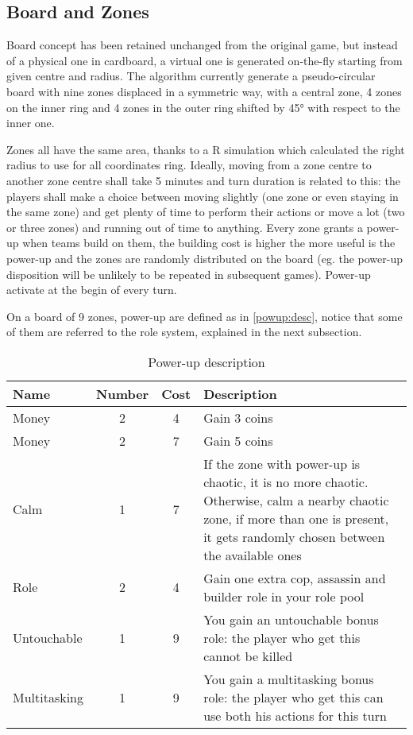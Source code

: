 		\subsection{Board and Zones}
		
			Board concept has been retained unchanged from the original game, but instead of a physical one in cardboard, a virtual one is generated on-the-fly starting from given centre and radius.
			The algorithm currently generate a pseudo-circular board with nine zones displaced in a symmetric way, with a central zone, 4 zones on the inner ring and 4 zones in the outer ring shifted by 45° with respect to the inner one.
			
			
			Zones all have the same area, thanks to a R simulation which calculated the right radius to use for all coordinates ring.
			Ideally, moving from a zone centre to another zone centre shall take 5 minutes and turn duration is related to this: the players shall make a choice between moving slightly (one zone or even staying in the same zone) and get plenty of time to perform their actions or move a lot (two or three zones) and running out of time to anything.
			Every zone grants a power-up when teams build on them, the building cost is higher the more useful is the power-up and the zones are randomly distributed on the board (eg. the power-up disposition will be unlikely to be repeated in subsequent games).
			Power-up activate at the begin of every turn.
			
			On a board of 9 zones, power-up are defined as in \autoref{powup:desc}, notice that some of them are referred to the role system, explained in the next subsection.
			
			\begin{table}
				\caption{Power-up description}
				\label{powup:desc}
				\centering
				\begin{tabular}{lccp{}}
					\toprule
					Name 			& Number 	& Cost 	& Description \\
					\midrule
					Money 			& 2 		& 4 	& Gain 3 coins \\
					Money 			& 2 		& 7 	& Gain 5 coins \\
					Calm 			& 1 		& 7 	& If the zone with power-up is chaotic, it is no more chaotic. Otherwise, calm a nearby chaotic zone, if more than one is present, it gets randomly chosen between the available ones \\
					Role 			& 2 		& 4 	& Gain one extra cop, assassin and builder role in your role pool \\
					Untouchable 	& 1 		& 9 	& You gain an untouchable bonus role: the player who get this cannot be killed \\
					Multitasking 	& 1 		& 9 	& You gain a multitasking bonus role: the player who get this can use both his actions for this turn \\
					\bottomrule
				\end{tabular}
			\end{table}
		
